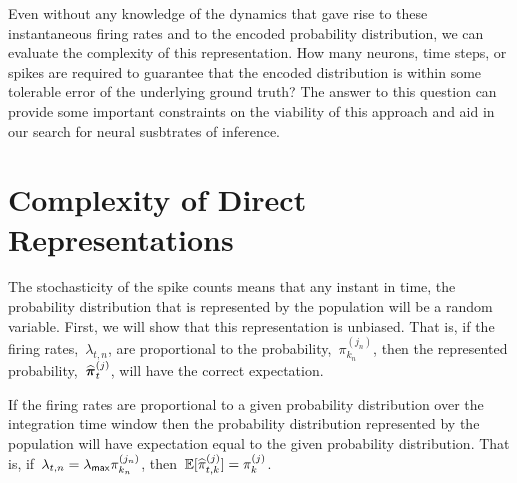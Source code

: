 Even without any knowledge of the dynamics that gave rise
to these instantaneous firing rates and to the
encoded probability distribution, we can evaluate the complexity
of this representation. How many neurons, time steps, or spikes
are required to guarantee that the encoded distribution is within
some tolerable error of the underlying ground truth? The answer
to this question can provide some important constraints on the
viability of this approach and aid in our search for neural
susbtrates of inference. 

\section{Complexity of Direct Representations}
The stochasticity of the spike counts means that any instant in 
time, the probability distribution that is represented by the population will 
be a random variable.  First, we will show that this representation 
is unbiased. That is, if the firing rates,~$\lambda_{t, n}$, 
are proportional to the probability,~$\pi_{k_n}^{(j_n)}$, then the 
represented probability,~$\widehat{\boldsymbol{\pi}}_{t}^{(j)}$, will have the  
correct expectation.

\begin{lemma}
\label{lem:consistency}
If the firing rates are proportional to a given probability
distribution over the integration time window then the probability
distribution represented by the population will have expectation equal
to the given probability distribution.  That is,
if~$\lambda_{t, n}=\lambda_{\mathsf{max}} \pi_{k_n}^{(j_n)}$,
then~$\mathbb{E}[\widehat{\pi}_{t,k}^{(j)}] = \pi_{k}^{(j)}$.
\end{lemma}

